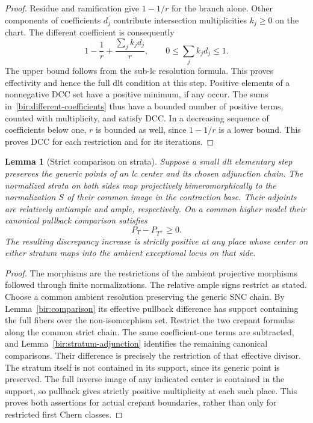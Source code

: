 \documentclass[11pt,letterpaper]{article}
\newtheorem{lemma}[theorem]{Lemma}
\theoremstyle{definition}
\theoremstyle{remark}
\begin{document}
\begin{proof}
Residue and ramification give $1-1/r$ for the branch alone.  Other
components of coefficients $d_j$ contribute intersection
multiplicities $k_j\geq0$ on the chart.  The different coefficient
is consequently
\begin{equation}
 1-\frac1r+\frac{\sum_jk_jd_j}{r},
 \qquad 0\leq\sum_jk_jd_j\leq1.
 \label{bir:different-coefficients}
\end{equation}
The upper bound follows from the sub-lc resolution formula.  This
proves effectivity and hence the full dlt condition at this step.
Positive elements of a nonnegative DCC set have a positive minimum,
if any occur.  The sums in~\eqref{bir:different-coefficients} thus
have a bounded number of positive terms, counted with multiplicity,
and satisfy DCC.  In a decreasing sequence of coefficients below
one, $r$ is bounded as well, since $1-1/r$ is a lower bound.  This
proves DCC for each restriction and for its iterations.
\end{proof}

\begin{lemma}[Strict comparison on strata]
\label{bir:stratum-comparison}
Suppose a small dlt elementary step preserves the generic points of
an lc center and its chosen adjunction chain.  The normalized
strata on both sides map projectively bimeromorphically to the
normalization $S$ of their common image in the contraction base.
Their adjoints are relatively antiample and ample, respectively.
On a common higher model their canonical pullback comparison
satisfies
\begin{equation}
 P_T-P_{T^+}\geq0.
 \label{bir:stratum-increase}
\end{equation}
The resulting discrepancy increase is strictly positive at any
place whose center on either stratum maps into the ambient
exceptional locus on that side.
\end{lemma}

\begin{proof}
The morphisms are the restrictions of the ambient projective
morphisms followed through finite normalizations.  The relative
ample signs restrict as stated.  Choose a common ambient resolution
preserving the generic SNC chain.  By
Lemma~\ref{bir:comparison} its effective pullback difference has
support containing the full fibers over the non-isomorphism set.
Restrict the two crepant formulas along the common strict chain.
The same coefficient-one terms are subtracted, and
Lemma~\ref{bir:stratum-adjunction} identifies the remaining canonical
comparisons.  Their difference is precisely the restriction of that
effective divisor.  The stratum itself is not contained in its
support, since its generic point is preserved.  The full inverse
image of any indicated center is contained in the support, so
pullback gives strictly positive multiplicity at each such place.
This proves both assertions for actual crepant boundaries, rather
than only for restricted first Chern classes.
\end{proof}
\end{document}
